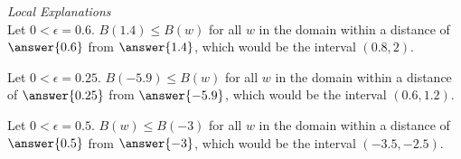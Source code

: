 \documentclass{ximera}
\begin{document}
\textit{Local Explanations} \\

Let $0 < \epsilon = 0.6$.  $B(1.4) \leq B(w)$ for all $w$ in the domain within a distance of $\answer{0.6}$ from $\answer{1.4}$, which would be the interval $(0.8, 2)$.

Let $0 < \epsilon = 0.25$.  $B(-5.9) \leq B(w)$ for all $w$ in the domain within a distance of $\answer{0.25}$ from $\answer{-5.9}$, which would be the interval $(0.6, 1.2)$.

Let $0 < \epsilon = 0.5$.  $B(w) \leq B(-3)$ for all $w$ in the domain within a distance of $\answer{0.5}$ from $\answer{-3}$, which would be the interval $(-3.5, -2.5)$.
\end{document}
